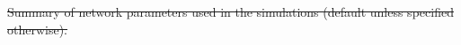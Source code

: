 \documentclass{article}
\providecommand{\DIFdeltex}[1]{{\protect\color{red}\sout{#1}}}                      %
\providecommand{\DIFdelFL}[1]{\DIFdel{#1}} %
\providecommand{\DIFdel}[1]{\texorpdfstring{\DIFdeltex{#1}}{}} %
\begin{document}
{%
\DIFdelFL{Summary of network parameters used in the simulations (default unless specified otherwise).}}
\end{document}
